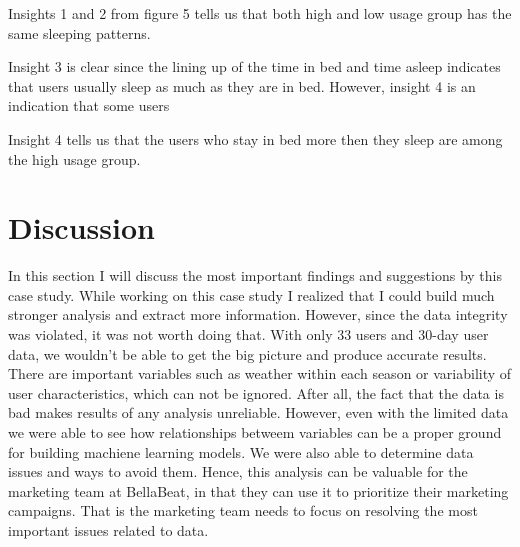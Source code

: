 \documentclass[
]{article}
\begin{document}
Insights 1 and 2 from figure 5 tells us that both high and low usage
group has the same sleeping patterns.

Insight 3 is clear since the lining up of the time in bed and time
asleep indicates that users usually sleep as much as they are in bed.
However, insight 4 is an indication that some users

Insight 4 tells us that the users who stay in bed more then they sleep
are among the high usage group.

\hypertarget{discussion}{%
\section{Discussion}\label{discussion}}

In this section I will discuss the most important findings and
suggestions by this case study. While working on this case study I
realized that I could build much stronger analysis and extract more
information. However, since the data integrity was violated, it was not
worth doing that. With only 33 users and 30-day user data, we wouldn't
be able to get the big picture and produce accurate results. There are
important variables such as weather within each season or variability of
user characteristics, which can not be ignored. After all, the fact that
the data is bad makes results of any analysis unreliable. However, even
with the limited data we were able to see how relationships betweem
variables can be a proper ground for building machiene learning models.
We were also able to determine data issues and ways to avoid them.
Hence, this analysis can be valuable for the marketing team at
BellaBeat, in that they can use it to prioritize their marketing
campaigns. That is the marketing team needs to focus on resolving the
most important issues related to data.
\end{document}
